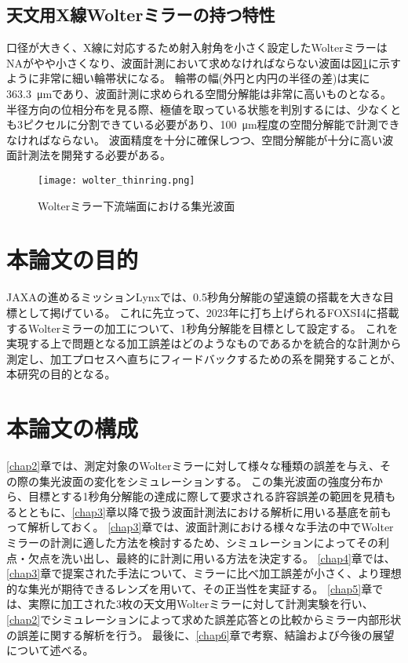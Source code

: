 \subsection{天文用X線Wolterミラーの持つ特性}
\label{chap1_wolter_specific_feature}

口径が大きく、X線に対応するため射入射角を小さく設定したWolterミラーはNAがやや小さくなり、波面計測において求めなければならない波面は図\ref{fig:wolter_thinring}に示すように非常に細い輪帯状になる。
輪帯の幅(外円と内円の半径の差)は実に\SI{363.3}{\micro \metre}であり、波面計測に求められる空間分解能は非常に高いものとなる。
半径方向の位相分布を見る際、極値を取っている状態を判別するには、少なくとも3ピクセルに分割できている必要があり、\SI{100}{\micro \metre}程度の空間分解能で計測できなければならない。
波面精度を十分に確保しつつ、空間分解能が十分に高い波面計測法を開発する必要がある。

\begin{figure}[h!]
\centering
\texttt{[image: wolter\_thinring.png]}
\caption{Wolterミラー下流端面における集光波面}
\label{fig:wolter_thinring}
\end{figure}


\clearpage
\newpage
\section{本論文の目的}
\label{chap1_purpose}

JAXAの進めるミッションLynxでは、0.5秒角分解能の望遠鏡の搭載を大きな目標として掲げている。\cite{Gaskin2019}
これに先立って、2023年に打ち上げられるFOXSI4に搭載するWolterミラーの加工について、1秒角分解能を目標として設定する。
これを実現する上で問題となる加工誤差はどのようなものであるかを統合的な計測から測定し、加工プロセスへ直ちにフィードバックするための系を開発することが、本研究の目的となる。

\section{本論文の構成}
\label{chap1_outline}

\ref{chap2}章では、測定対象のWolterミラーに対して様々な種類の誤差を与え、その際の集光波面の変化をシミュレーションする。
この集光波面の強度分布から、目標とする1秒角分解能の達成に際して要求される許容誤差の範囲を見積もるとともに、\ref{chap3}章以降で扱う波面計測法における解析に用いる基底を前もって解析しておく。
\ref{chap3}章では、波面計測における様々な手法の中でWolterミラーの計測に適した方法を検討するため、シミュレーションによってその利点・欠点を洗い出し、最終的に計測に用いる方法を決定する。
\ref{chap4}章では、\ref{chap3}章で提案された手法について、ミラーに比べ加工誤差が小さく、より理想的な集光が期待できるレンズを用いて、その正当性を実証する。
\ref{chap5}章では、実際に加工された3枚の天文用Wolterミラーに対して計測実験を行い、\ref{chap2}でシミュレーションによって求めた誤差応答との比較からミラー内部形状の誤差に関する解析を行う。
最後に、\ref{chap6}章で考察、結論および今後の展望について述べる。

